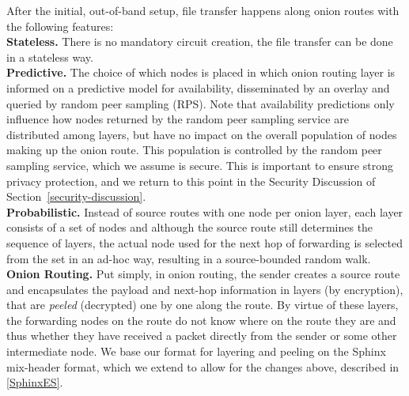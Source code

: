 After the initial, out-of-band setup, file transfer happens along
onion routes with the following features:\\
\textbf{Stateless.} There is no mandatory circuit creation, the file transfer can be
  done in a stateless way. \\
 \textbf{Predictive.} The choice of which nodes is placed in which onion routing
  layer is informed on a predictive model for availability, disseminated
  by an overlay and queried by random peer sampling (RPS). Note that availability predictions only influence how nodes returned by the random peer sampling service are distributed among layers, but have no impact on the overall population of nodes making up the onion route. This population is controlled by the random peer sampling service, which we assume is secure. This is important to ensure strong privacy protection, and we return to this point in the Security Discussion of Section~\ref{security-discussion}.\\
 \textbf{Probabilistic.} Instead of source routes with one node per onion layer, each
  layer consists of a set of nodes and although the source route still
  determines the sequence of layers, the actual node used for the next
  hop of forwarding is selected from the set in an ad-hoc way,
  resulting in a source-bounded random walk.\\
 \textbf{Onion Routing.} Put simply, in onion routing, the sender creates
  a source route and encapsulates the payload and next-hop information in layers (by
  encryption), that are \emph{peeled} (decrypted) one by one along the
  route. By virtue of these layers, the forwarding nodes on the
  route do not know where on the route they are and thus whether they
  have received a packet directly from the sender or some other
  intermediate node. We base our format for layering and peeling on the
  \ac{Sphinx} mix-header format, which we extend to allow for the
  changes above, described in \cref{SphinxES}.

